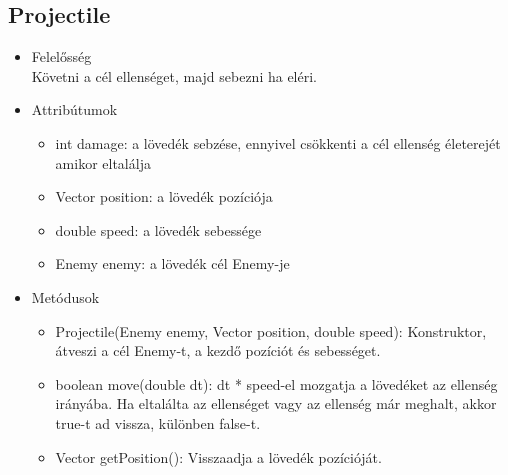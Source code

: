 \subsection{Projectile}
\begin{itemize}
\item Felelősség\\
Követni a cél ellenséget, majd sebezni ha eléri.
\item Attribútumok
	\begin{itemize}
		\item int damage: a lövedék sebzése, ennyivel csökkenti a cél ellenség életerejét amikor eltalálja
		\item Vector position: a lövedék pozíciója
		\item double speed: a lövedék sebessége
		\item Enemy enemy: a lövedék cél Enemy-je
	\end{itemize}
\item Metódusok
	\begin{itemize}
		\item Projectile(Enemy enemy, Vector position, double speed): Konstruktor, átveszi a cél Enemy-t, a kezdő pozíciót és sebességet.
		\item boolean move(double dt): dt * speed-el mozgatja a lövedéket az ellenség irányába. Ha eltalálta az ellenséget vagy az ellenség már meghalt, akkor true-t ad vissza, különben false-t.
		\item Vector getPosition(): Visszaadja a lövedék pozícióját.
	\end{itemize}
\end{itemize}

